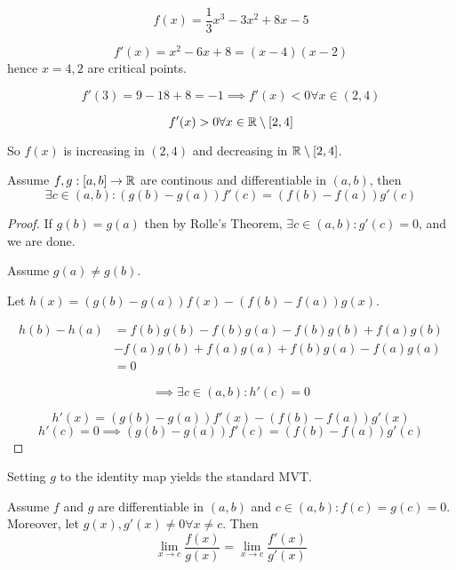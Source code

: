 \documentclass[a4paper,10pt]{article}
\begin{document}
\begin{ex}
	\[ f(x) = \frac{1}{3}x^3 - 3x^2 + 8x - 5 \]

	\[ f'(x) = x^2 - 6x + 8 = (x-4)(x-2) \]
	hence $x=4,2$ are critical points.

	\[ f'(3) = 9 - 18 + 8 = -1 \implies f'(x) < 0 \forall x \in (2,4) \]

	\[ f'(x) > 0 \forall x \in \mathbb{R} \setminus [2,4] \]

	So $f(x)$ is increasing in $(2,4)$ and decreasing in $\mathbb{R} \setminus [2,4]$.
\end{ex}

\begin{thm}
	Assume $f,g:[a,b] \to \mathbb{R}$ are continous and differentiable in $(a,b)$, then
	\[ \exists c \in (a,b) : (g(b) - g(a))f'(c) = (f(b) - f(a))g'(c) \]
\end{thm}

\begin{proof}
	If $g(b) = g(a)$ then by Rolle's Theorem, $\exists c \in (a,b) : g'(c) = 0$, and we are done.

	Assume $g(a) \neq g(b)$.

	Let $h(x) = (g(b) - g(a))f(x) - (f(b) - f(a))g(x)$.

	\begin{align*}
		h(b) - h(a) &= f(b)g(b) - f(b)g(a) - f(b)g(b) + f(a)g(b) \\
		&- f(a)g(b) + f(a)g(a) + f(b)g(a) - f(a)g(a) \\
		&= 0
	\end{align*}

	\[ \implies \exists c \in (a,b) : h'(c) = 0 \]

	\[ h'(x) = (g(b) - g(a))f'(x) - (f(b) - f(a))g'(x) \]
	\[ h'(c) = 0 \implies (g(b) - g(a))f'(c) = (f(b) - f(a))g'(c) \]
\end{proof}

\begin{rem}
	Setting $g$ to the identity map yields the standard MVT\@.
\end{rem}

\begin{lemma}
	Assume $f$ and $g$ are differentiable in $(a,b)$ and $c \in (a,b) : f(c) = g(c) = 0$.
	Moreover, let $g(x), g'(x) \neq 0 \forall x \neq c$. Then
	\[ \lim_{x \to c} \frac{f(x)}{g(x)} = \lim_{x \to c} \frac{f'(x)}{g'(x)} \]
\end{lemma}
\end{document}
